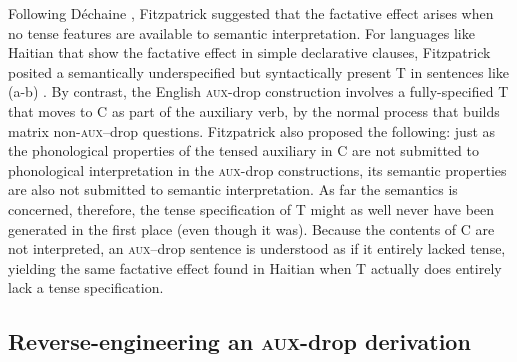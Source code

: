 \documentclass[output=paper]{langscibook}
\begin{document}
\noindent Following Déchaine \citeyearpar{Dechaine1991}, Fitzpatrick suggested that the factative effect arises when no tense features are available to semantic interpretation. For languages like Haitian that show the factative effect in simple declarative clauses, Fitzpatrick posited a semantically underspecified but syntactically present T in sentences like (a-b) . By contrast, the English \textsc{aux-}drop construction involves a fully-specified T that moves to C as part of the auxiliary verb, by the normal process that builds matrix non-\textsc{aux}--drop questions. Fitzpatrick also proposed the following: just as the phonological properties of the tensed auxiliary in C are not submitted to phonological interpretation in the \textsc{aux-}drop constructions, its semantic properties are also not submitted to semantic interpretation. As far the semantics is concerned, therefore, the tense specification of T might as well never have been generated in the first place (even though it was). Because the contents of C are not interpreted, an \textsc{aux}--drop sentence is understood as if it entirely lacked tense, yielding the same factative effect found in Haitian when T actually does entirely lack a tense specification.


\subsection{\protect\label{subsec:Reverse-engineering-an-aux-drop}Reverse-engineering
an\textsc{ aux-}drop\textsc{ }derivation}
\end{document}
